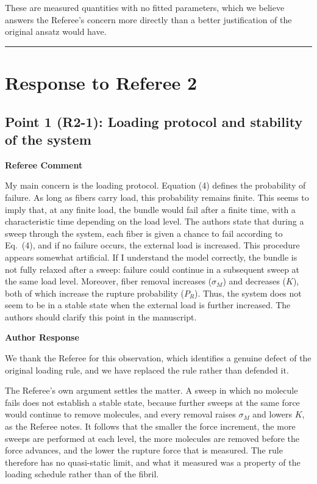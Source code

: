 \documentclass[11pt]{article}
\newenvironment{refereecomment}
  {%
    \par
    \begingroup
    \color{commentgray}
    \itshape
    \setlength{\leftskip}{1.4em}
    \setlength{\rightskip}{1.4em}
  }
  {%
    \par
    \endgroup
  }
\newcommand{\refereelabel}{%
  \par\smallskip
  {\color{commentgray}\bfseries Referee Comment}\par
}
\newcommand{\responselabel}{%
  \par\medskip
  {\color{responseblue}\bfseries Author Response}\par
}
\newcommand{\pointseparator}{%
  \par\bigskip
  {\color{rulegray}\hrule}
  \par\bigskip
}
\begin{document}
These are measured quantities with no fitted parameters, which we believe
answers the Referee's concern more directly than a better justification of the
original ansatz would have.


\pointseparator

\clearpage
\section*{\LARGE Response to Referee 2}


\subsection*{Point 1 (R2-1): Loading protocol and stability of the system}

\refereelabel
\begin{refereecomment}
  My main concern is the loading protocol. Equation (4) defines the probability
  of failure. As long as fibers carry load, this probability remains finite.
  This seems to imply that, at any finite load, the bundle would fail after a
  finite time, with a characteristic time depending on the load level. The
  authors state that during a sweep through the system, each fiber is given a
  chance to fail according to Eq.~(4), and if no failure occurs, the external
  load is increased. This procedure appears somewhat artificial. If I understand
  the model correctly, the bundle is not fully relaxed after a sweep: failure
  could continue in a subsequent sweep at the same load level. Moreover, fiber
  removal increases (\(\sigma_M\)) and decreases (\(K\)), both of which increase
  the rupture probability (\(P_R\)). Thus, the system does not seem to be in a
  stable state when the external load is further increased. The authors should
  clarify this point in the manuscript.
\end{refereecomment}

\responselabel

We thank the Referee for this observation, which identifies a genuine defect of
the original loading rule, and we have replaced the rule rather than defended
it.

The Referee's own argument settles the matter. A sweep in which no molecule
fails does not establish a stable state, because further sweeps at the same
force would continue to remove molecules, and every removal raises $\sigma_M$
and lowers $K$, as the Referee notes. It follows that the smaller the force
increment, the more sweeps are performed at each level, the more molecules are
removed before the force advances, and the lower the rupture force that is
measured. The rule therefore has no quasi-static limit, and what it measured was
a property of the loading schedule rather than of the fibril.
\end{document}
